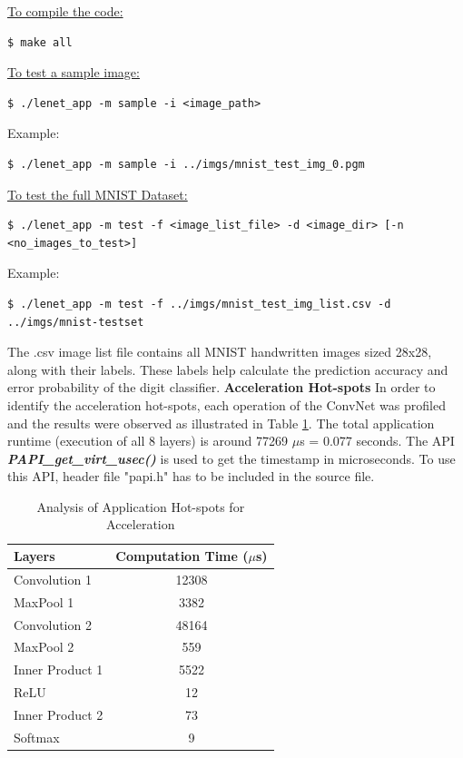 \underline{To compile the code:}
\begin{scriptsize}
\linuxbash
\begin{lstlisting}
$ make all
\end{lstlisting}
\end{scriptsize}
\underline{To test a sample image:}
\begin{scriptsize}
\linuxbash
\begin{lstlisting}
$ ./lenet_app -m sample -i <image_path>
\end{lstlisting}
\end{scriptsize}
Example: 
\begin{scriptsize}
\linuxbash
\begin{lstlisting}
$ ./lenet_app -m sample -i ../imgs/mnist_test_img_0.pgm
\end{lstlisting}
\end{scriptsize}
\underline{To test the full MNIST Dataset:}
\begin{scriptsize}
\linuxbash
\begin{lstlisting}
$ ./lenet_app -m test -f <image_list_file> -d <image_dir> [-n <no_images_to_test>]
\end{lstlisting}
\end{scriptsize}
Example: 
\begin{scriptsize}
\linuxbash
\begin{lstlisting}
$ ./lenet_app -m test -f ../imgs/mnist_test_img_list.csv -d ../imgs/mnist-testset
\end{lstlisting}
\end{scriptsize}
The .csv image list file contains all MNIST handwritten images sized 28x28, along with their labels. These labels help calculate the prediction accuracy and error probability of the digit classifier.\newline
\textbf{Acceleration Hot-spots} \newline 
In order to identify the acceleration hot-spots, each operation of the ConvNet was profiled and the results were observed as illustrated in Table \ref{table:sw_hotspots}. The total application runtime (execution of all 8 layers) is around 77269 $\mu$s = 0.077 seconds. The API \textit{\textbf{PAPI\_get\_virt\_usec()}} is used to get the timestamp in microseconds. To use this API, header file "papi.h" has to be included in the source file.
\begin{table}[htbp]
\caption{Analysis of Application Hot-spots for Acceleration}
\centering
\begin{tabular}{l c}
\toprule
\textbf{Layers }& \textbf{Computation Time ($\mu$s)}\\
\midrule
Convolution 1 &12308\\
\midrule
MaxPool 1 &3382\\
\midrule
Convolution 2 &48164\\
\midrule
MaxPool 2 &559\\
\midrule
Inner Product 1 &5522\\
\midrule
ReLU&12\\
\midrule
Inner Product 2 &73\\
\midrule
Softmax&9\\
\bottomrule
\end{tabular}
\label{table:sw_hotspots}
\end{table}
